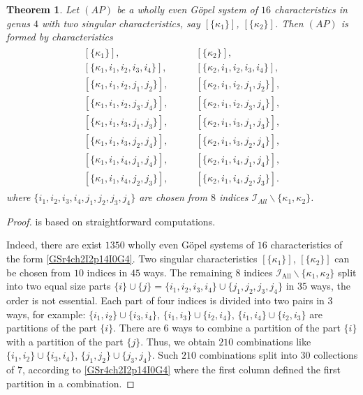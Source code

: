 \documentclass[twoside]{amsart}
\newcommand{\I}{\mathcal{I}}
\newtheorem{theo}{Theorem}[section]
\theoremstyle{definition}
\theoremstyle{plain}
\begin{document}
\begin{theo}\label{T:GSr4Struct}
Let $(A P)$ be a wholly even G\"{o}pel system of $16$ characteristics in genus $4$
with two singular characteristics, say $[\{\kappa_1\}]$, $[\{\kappa_2\}]$. 
Then $(A P)$ is formed by characteristics
\begin{gather}\label{GSr4ch2I2p14I0G4}
\begin{split}
[\{\kappa_1\}],  \qquad  &[\{\kappa_2\}],\\ 
[\{\kappa_1,i_1,i_2,i_3,i_4\}],\qquad
&[\{\kappa_2,i_1,i_2,i_3,i_4\}],\\
[\{\kappa_1,i_1,i_2,j_1,j_2\}],\qquad
&[\{\kappa_2,i_1,i_2,j_1,j_2\}],\\
[\{\kappa_1,i_1,i_2,j_3,j_4\}],\qquad
&[\{\kappa_2,i_1,i_2,j_3,j_4\}],\\
[\{\kappa_1,i_1,i_3,j_1,j_3\}],\qquad
&[\{\kappa_2,i_1,i_3,j_1,j_3\}], \\
[\{\kappa_1,i_1,i_3,j_2,j_4\}],\qquad
&[\{\kappa_2,i_1,i_3,j_2,j_4\}], \\
[\{\kappa_1,i_1,i_4,j_1,j_4\}],\qquad
&[\{\kappa_2,i_1,i_4,j_1,j_4\}], \\
[\{\kappa_1,i_1,i_4,j_2,j_3\}],\qquad
&[\{\kappa_2,i_1,i_4,j_2,j_3\}].
\end{split}
\end{gather}
where $\{i_1,i_2,i_3,i_4,j_1,j_2,j_3,j_4\}$ are chosen from 
$8$ indices $\I_{All}\backslash \{\kappa_1,\kappa_2\}$.
\end{theo}

\begin{proof} is based on straightforward computations.

Indeed, there are exist $1350$  wholly even G\"{o}pel systems of $16$ characteristics
of the form \eqref{GSr4ch2I2p14I0G4}.
Two singular characteristics $[\{\kappa_1\}]$,  $[\{\kappa_2\}]$
can be chosen from $10$ indices in $45$ ways. 
The remaining 8 indices $\I_{\text{All}}\backslash \{\kappa_1,\kappa_2\}$ 
split into two equal size parts $\{i\}\cup\{j\} = \{i_1,i_2,i_3,i_4\}\cup\{j_1,j_2,j_3,j_4\}$ in $35$ ways,
 the order is not essential. 
Each part of four indices is divided into two pairs in $3$ ways, for example:
$\{i_1,i_2\} \cup \{i_3,i_4\}$, $\{i_1,i_3\}\cup \{i_2,i_4\}$, $\{i_1,i_4\}\cup \{i_2,i_3\}$ are
partitions of the part $\{i\}$. There are $6$ ways to combine a partition of the part $\{i\}$ 
with a partition of the part $\{j\}$. Thus, we obtain $210$ combinations like
$\{i_1,i_2\} \cup \{i_3,i_4\}$, $\{j_1,j_2\} \cup \{j_3,j_4\}$. Such $210$ combinations
split into $30$ collections of $7$, according to \eqref{GSr4ch2I2p14I0G4}
where the first column defined the first partition in a combination. 
\end{proof}
\end{document}
